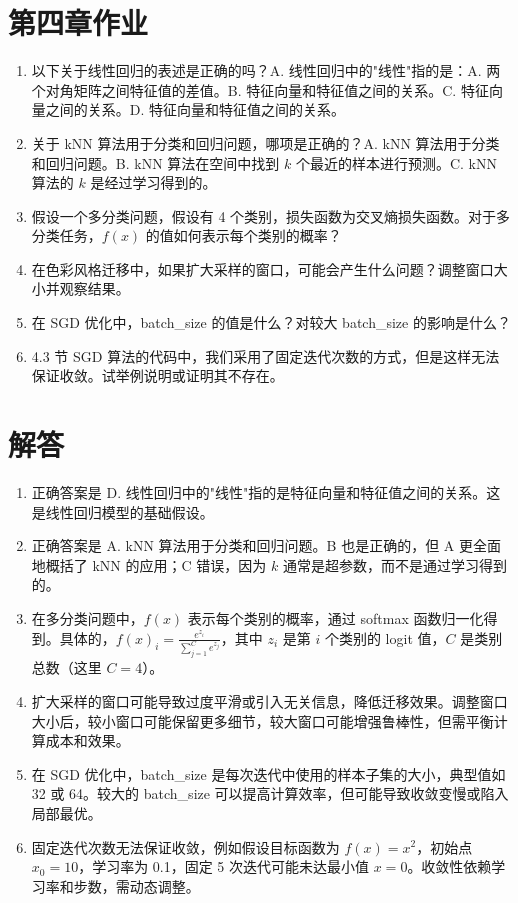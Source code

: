\documentclass[a4paper,12pt]{book}
\begin{document}
\section*{第四章作业}

\begin{enumerate}
    \item 以下关于线性回归的表述是正确的吗？A. 线性回归中的"线性"指的是：A. 两个对角矩阵之间特征值的差值。B. 特征向量和特征值之间的关系。C. 特征向量之间的关系。D. 特征向量和特征值之间的关系。
    \item 关于 kNN 算法用于分类和回归问题，哪项是正确的？A. kNN 算法用于分类和回归问题。B. kNN 算法在空间中找到 $k$ 个最近的样本进行预测。C. kNN 算法的 $k$ 是经过学习得到的。
    \item 假设一个多分类问题，假设有 4 个类别，损失函数为交叉熵损失函数。对于多分类任务，$f(x)$ 的值如何表示每个类别的概率？
    \item 在色彩风格迁移中，如果扩大采样的窗口，可能会产生什么问题？调整窗口大小并观察结果。
    \item 在 SGD 优化中，batch\_size 的值是什么？对较大 batch\_size 的影响是什么？
    \item 4.3 节 SGD 算法的代码中，我们采用了固定迭代次数的方式，但是这样无法保证收敛。试举例说明或证明其不存在。
\end{enumerate}

\section*{解答}

\begin{enumerate}
    \item 正确答案是 D. 线性回归中的"线性"指的是特征向量和特征值之间的关系。这是线性回归模型的基础假设。
    \item 正确答案是 A. kNN 算法用于分类和回归问题。B 也是正确的，但 A 更全面地概括了 kNN 的应用；C 错误，因为 $k$ 通常是超参数，而不是通过学习得到的。
    \item 在多分类问题中，$f(x)$ 表示每个类别的概率，通过 softmax 函数归一化得到。具体的，$f(x)_i = \frac{e^{z_i}}{\sum_{j=1}^C e^{z_j}}$，其中 $z_i$ 是第 $i$ 个类别的 logit 值，$C$ 是类别总数（这里 $C = 4$）。
    \item 扩大采样的窗口可能导致过度平滑或引入无关信息，降低迁移效果。调整窗口大小后，较小窗口可能保留更多细节，较大窗口可能增强鲁棒性，但需平衡计算成本和效果。
    \item 在 SGD 优化中，batch\_size 是每次迭代中使用的样本子集的大小，典型值如 32 或 64。较大的 batch\_size 可以提高计算效率，但可能导致收敛变慢或陷入局部最优。
    \item 固定迭代次数无法保证收敛，例如假设目标函数为 $f(x) = x^2$，初始点 $x_0 = 10$，学习率为 0.1，固定 5 次迭代可能未达最小值 $x = 0$。收敛性依赖学习率和步数，需动态调整。
\end{enumerate}
\end{document}

